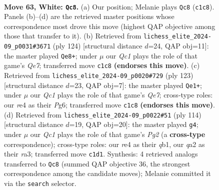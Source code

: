 \documentclass[11pt]{article}
\begin{document}
\clearpage

\begin{figure}[p]\centering
\begin{subfigure}{0.46\textwidth}\centering
\resizebox{\linewidth}{!}{%
\newchessgame
\chessboard[
  setfen={8/8/5pk1/3p4/4r3/6PK/q6P/2Q5 w - - 6 63},
  showmover=false,
  pgfstyle=straightmove, color=movearrow, markmove={c1-c8}
]}
\caption{}
\end{subfigure}\hfill
\begin{subfigure}{0.46\textwidth}\centering
\resizebox{\linewidth}{!}{%
\newchessgame
\chessboard[
  setfen={6k1/4Q3/6p1/8/3p4/3q2PP/6K1/8 w - - 9 63},
  showmover=false,
  pgfstyle=straightmove, color=movearrow, markmove={e7-e8}
]}
\caption{}
\end{subfigure}
\\[4pt]
\begin{subfigure}{0.46\textwidth}\centering
\resizebox{\linewidth}{!}{%
\newchessgame
\chessboard[
  setfen={8/3QP3/1p4p1/2k2p2/8/6P1/4q3/6K1 b - - 4 62},
  showmover=false,
  pgfstyle=straightmove, color=movearrow, markmove={e2-e1}
]}
\caption{}
\end{subfigure}\hfill
\begin{subfigure}{0.46\textwidth}\centering
\resizebox{\linewidth}{!}{%
\newchessgame
\chessboard[
  setfen={8/8/8/kp6/7p/r6P/6PK/1q6 w - - 0 58},
  showmover=false,
  pgfstyle=straightmove, color=movearrow, markmove={g2-g4}
]}
\caption{}
\end{subfigure}
\caption{\textbf{Move 63, White: \texttt{Qc8}.} (a) Our position; Melanie plays \texttt{Qc8} (\texttt{c1c8}). Panels (b)--(d) are the retrieved master positions whose correspondence most drove this move (highest QAP objective among those that transfer to it). (b) Retrieved from \texttt{lichess\_elite\_2024-09\_p0031\#3671} (ply 124) [structural distance $d$=24, QAP obj=11]: the master played \texttt{Qe8+}; under $\mu$ our \emph{Qc1} plays the role of that game's \emph{Qe7}; transferred move \texttt{c1c8} \textbf{(endorses this move)}. (c) Retrieved from \texttt{lichess\_elite\_2024-09\_p0020\#729} (ply 123) [structural distance $d$=23, QAP obj=7]: the master played \texttt{Qe1+}; under $\mu$ our \emph{Qc1} plays the role of that game's \emph{Qe7}; cross-type roles: our \emph{r}e4 as their \emph{P}g6; transferred move \texttt{c1c8} \textbf{(endorses this move)}. (d) Retrieved from \texttt{lichess\_elite\_2024-09\_p0022\#51} (ply 114) [structural distance $d$=19, QAP obj=20]: the master played \texttt{g4}; under $\mu$ our \emph{Qc1} plays the role of that game's \emph{Pg2} (a \textbf{cross-type} correspondence); cross-type roles: our \emph{r}e4 as their \emph{q}b1, our \emph{q}a2 as their \emph{r}a3; transferred move \texttt{c1d1}. Synthesis: 4 retrieved analogs transferred to \texttt{Qc8} (summed QAP objective 36, the strongest correspondence among the candidate moves); Melanie committed it via the \texttt{search} selector.}
\label{fig:thought-m124}
\end{figure}
\end{document}
